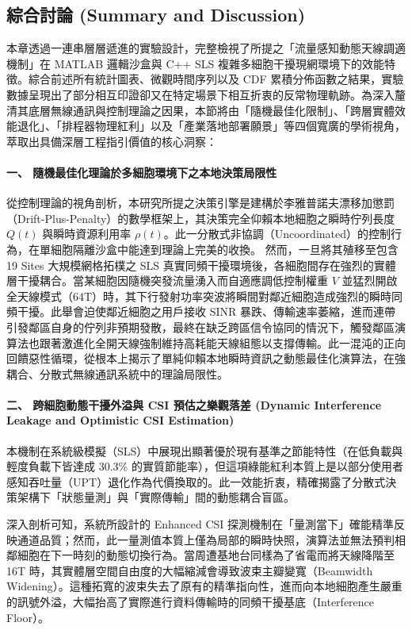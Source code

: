 \subsection{綜合討論 (Summary and Discussion)}
\label{sec:summary_discussion}

本章透過一連串層層遞進的實驗設計，完整檢視了所提之「流量感知動態天線調適機制」在 MATLAB 邏輯沙盒與 C++ SLS 複雜多細胞干擾現網環境下的效能特徵。綜合前述所有統計圖表、微觀時間序列以及 CDF 累積分佈函數之結果，實驗數據呈現出了部分相互印證卻又在特定場景下相互折衷的反常物理軌跡。為深入釐清其底層無線通訊與控制理論之因果，本節將由「隨機最佳化限制」、「跨層實體效能退化」、「排程器物理紅利」以及「產業落地部署願景」等四個寬廣的學術視角，萃取出具備深層工程指引價值的核心洞察：

\paragraph{一、 隨機最佳化理論於多細胞環境下之本地決策局限性}
從控制理論的視角剖析，本研究所提之決策引擎是建構於李雅普諾夫漂移加懲罰（Drift-Plus-Penalty）的數學框架上，其決策完全仰賴本地細胞之瞬時佇列長度 $Q(t)$ 與瞬時資源利用率 $\rho(t)$。此一分散式非協調（Uncoordinated）的控制行為，在單細胞隔離沙盒中能達到理論上完美的收換。
然而，一旦將其殖移至包含 19 Sites 大規模網格拓樸之 SLS 真實同頻干擾環境後，各細胞間存在強烈的實體層干擾耦合。當某細胞因隨機突發流量湧入而自適應調低控制權重 $V$ 並猛烈開啟全天線模式（64T）時，其下行發射功率突波將瞬間對鄰近細胞造成強烈的瞬時同頻干擾。此舉會迫使鄰近細胞之用戶接收 SINR 暴跌、傳輸速率萎縮，進而連帶引發鄰區自身的佇列非預期發散，最終在缺乏跨區信令協同的情況下，觸發鄰區演算法也跟著激進化全開天線強制維持高耗能天線組態以支撐傳輸。此一混沌的正向回饋惡性循環，從根本上揭示了單純仰賴本地瞬時資訊之動態最佳化演算法，在強耦合、分散式無線通訊系統中的理論局限性。

\paragraph{二、 跨細胞動態干擾外溢與 CSI 預估之樂觀落差 (Dynamic Interference Leakage and Optimistic CSI Estimation)} 
本機制在系統級模擬（SLS）中展現出顯著優於現有基準之節能特性（在低負載與輕度負載下皆達成 30.3\% 的實質節能率），但這項綠能紅利本質上是以部分使用者感知吞吐量（UPT）退化作為代價換取的。此一效能折衷，精確揭露了分散式決策架構下「狀態量測」與「實際傳輸」間的動態耦合盲區。

深入剖析可知，系統所設計的 Enhanced CSI 探測機制在「量測當下」確能精準反映通道品質；然而，此一量測值本質上僅為局部的瞬時快照，演算法並無法預判相鄰細胞在下一時刻的動態切換行為。當周遭基地台同樣為了省電而將天線降階至 16T 時，其實體層空間自由度的大幅縮減會導致波束主瓣變寬（Beamwidth Widening）。這種拓寬的波束失去了原有的精準指向性，進而向本地細胞產生嚴重的訊號外溢，大幅抬高了實際進行資料傳輸時的同頻干擾基底（Interference Floor）。

